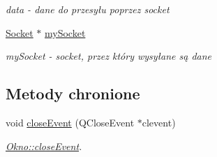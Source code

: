 \begin{DoxyCompactItemize}
\begin{DoxyCompactList}\small\item\em data -\/ dane do przesyłu poprzez socket \end{DoxyCompactList}\item 
\hypertarget{class_okno_a58a686222d1cc92f47d454c2481ce8d8}{\hyperlink{class_socket}{Socket} $\ast$ \hyperlink{class_okno_a58a686222d1cc92f47d454c2481ce8d8}{my\-Socket}}\label{class_okno_a58a686222d1cc92f47d454c2481ce8d8}

\begin{DoxyCompactList}\small\item\em my\-Socket -\/ socket, przez który wysyłane są dane \end{DoxyCompactList}\end{DoxyCompactItemize}
\subsection*{Metody chronione}
\begin{DoxyCompactItemize}
\item 
void \hyperlink{class_okno_aecd3efa2e5687dad240bf830c73984ba}{close\-Event} (Q\-Close\-Event $\ast$clevent)
\begin{DoxyCompactList}\small\item\em \hyperlink{class_okno_aecd3efa2e5687dad240bf830c73984ba}{Okno\-::close\-Event}. \end{DoxyCompactList}\end{DoxyCompactItemize}

